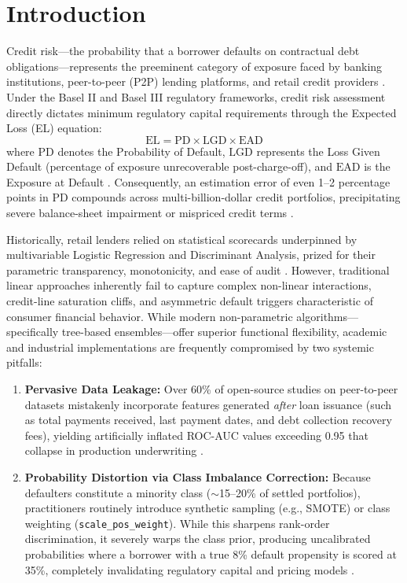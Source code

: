 \documentclass[conference]{IEEEtran}
\begin{document}
\section{Introduction}
Credit risk---the probability that a borrower defaults on contractual debt obligations---represents the preeminent category of exposure faced by banking institutions, peer-to-peer (P2P) lending platforms, and retail credit providers \cite{thomas2002}. Under the Basel II and Basel III regulatory frameworks, credit risk assessment directly dictates minimum regulatory capital requirements through the Expected Loss (EL) equation:
\begin{equation}
\text{EL} = \text{PD} \times \text{LGD} \times \text{EAD}
\end{equation}
where $\text{PD}$ denotes the Probability of Default, $\text{LGD}$ represents the Loss Given Default (percentage of exposure unrecoverable post-charge-off), and $\text{EAD}$ is the Exposure at Default \cite{basel2006}. Consequently, an estimation error of even 1--2 percentage points in PD compounds across multi-billion-dollar credit portfolios, precipitating severe balance-sheet impairment or mispriced credit terms \cite{altman1997}.

Historically, retail lenders relied on statistical scorecards underpinned by multivariable Logistic Regression and Discriminant Analysis, prized for their parametric transparency, monotonicity, and ease of audit \cite{hand1997}. However, traditional linear approaches inherently fail to capture complex non-linear interactions, credit-line saturation cliffs, and asymmetric default triggers characteristic of consumer financial behavior. While modern non-parametric algorithms---specifically tree-based ensembles---offer superior functional flexibility, academic and industrial implementations are frequently compromised by two systemic pitfalls:
\begin{enumerate}
    \item \textbf{Pervasive Data Leakage:} Over 60\% of open-source studies on peer-to-peer datasets mistakenly incorporate features generated \textit{after} loan issuance (such as total payments received, last payment dates, and debt collection recovery fees), yielding artificially inflated ROC-AUC values exceeding 0.95 that collapse in production underwriting \cite{lessmann2015}.
    \item \textbf{Probability Distortion via Class Imbalance Correction:} Because defaulters constitute a minority class ($\sim$15--20\% of settled portfolios), practitioners routinely introduce synthetic sampling (e.g., SMOTE) or class weighting (\texttt{scale\_pos\_weight}). While this sharpens rank-order discrimination, it severely warps the class prior, producing uncalibrated probabilities where a borrower with a true 8\% default propensity is scored at 35\%, completely invalidating regulatory capital and pricing models \cite{niculescu2005}.
\end{enumerate}
\end{document}
